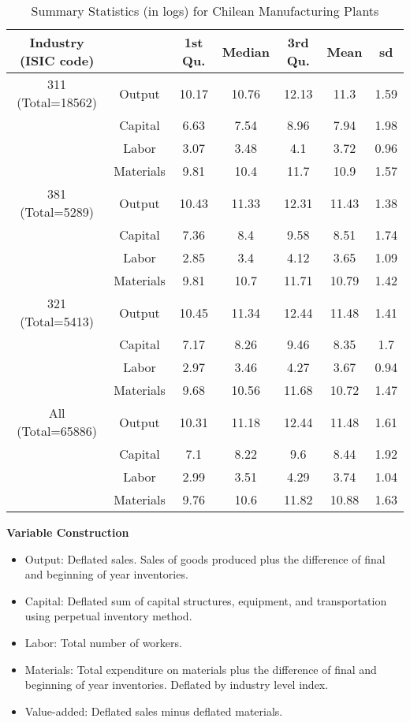 \documentclass[12pt]{article}
\begin{document}
\begin{appendices}
\begin{table}[H]
\centering
\caption{Summary Statistics (in logs) for Chilean Manufacturing Plants}
\small
\begin{tabular}{ccccccc}
  \hline\hline Industry (ISIC code) &   & 1st Qu. & Median & 3rd Qu. & Mean & sd \\ 
  \hline
311 (Total=18562) & Output & 10.17 & 10.76 & 12.13 & 11.3 & 1.59 \\ 
   & Capital & 6.63 & 7.54 & 8.96 & 7.94 & 1.98 \\ 
   & Labor & 3.07 & 3.48 & 4.1 & 3.72 & 0.96 \\ 
   & Materials & 9.81 & 10.4 & 11.7 & 10.9 & 1.57 \\ 
  381 (Total=5289) & Output & 10.43 & 11.33 & 12.31 & 11.43 & 1.38 \\ 
   & Capital & 7.36 & 8.4 & 9.58 & 8.51 & 1.74 \\ 
   & Labor & 2.85 & 3.4 & 4.12 & 3.65 & 1.09 \\ 
   & Materials & 9.81 & 10.7 & 11.71 & 10.79 & 1.42 \\ 
  321 (Total=5413) & Output & 10.45 & 11.34 & 12.44 & 11.48 & 1.41 \\ 
   & Capital & 7.17 & 8.26 & 9.46 & 8.35 & 1.7 \\ 
   & Labor & 2.97 & 3.46 & 4.27 & 3.67 & 0.94 \\ 
   & Materials & 9.68 & 10.56 & 11.68 & 10.72 & 1.47 \\ 
  All (Total=65886) & Output & 10.31 & 11.18 & 12.44 & 11.48 & 1.61 \\ 
   & Capital & 7.1 & 8.22 & 9.6 & 8.44 & 1.92 \\ 
   & Labor & 2.99 & 3.51 & 4.29 & 3.74 & 1.04 \\ 
   & Materials & 9.76 & 10.6 & 11.82 & 10.88 & 1.63 \\ 
   \hline
\end{tabular}
\label{CHLsum}
\end{table}

\textbf{Variable Construction}
\begin{itemize}
	\item Output: Deflated sales. Sales of goods produced plus the difference of final and beginning of year inventories.
	\item Capital: Deflated sum of capital structures, equipment, and transportation using perpetual inventory method.
	\item Labor: Total number of workers.
	\item Materials: Total expenditure on materials plus the difference of final and beginning of year inventories. Deflated by industry level index.
	\item Value-added: Deflated sales minus deflated materials.
\end{itemize}


\end{appendices}
\end{document}
